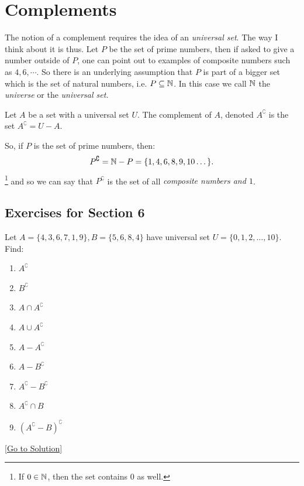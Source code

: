 \section{Complements}
The notion of a complement requires the idea of an \emph{universal set}. The way I think about it is thus. Let $P$ be the set of prime numbers, then if asked to give a number outside of $P$, one can point out to examples of composite numbers such as $4,6, \cdots$. So there is an underlying assumption that $P$ is part of a bigger set which is the set of natural numbers, i.e. $P\subseteq\mathbb{N}$. In this case we call $\mathbb{N}$ the \emph{universe} or the \emph{universal set.}
\begin{defn}
    Let $A$ be a set with a universal set $U$. The complement of $A$, denoted $A^{\complement}$ is the set $A^{\complement}=U-A$.
\end{defn}

So, if $P$ is the set of prime numbers, then: 
$$
P^{\complement}=\mathbb{N}-P=\{ 1,4,6,8,9,10\dots \}.
$$\footnote{If $0\in\mathbb{N}$, then the set contains $0$ as well.}
and so we can say that $P^{\complement}$ is the set of all \emph{composite numbers and $1$}. 

\subsection{Exercises for Section 6}
\begin{exercise}\label{ex:6.1}
    Let $A=\{ 4,3,6,7,1,9 \}, B=\{ 5,6,8,4 \}$ have universal set $U=\{ 0,1,2,\dots,10 \}$. Find: 
    \begin{enumerate}
        \item $A^{\complement}$
        \item $B^{\complement}$
        \item $A\cap A^{\complement}$
        \item $A\cup A^{\complement}$
        \item $A-A^{\complement}$
        \item $A-B^{\complement}$
        \item $A^{\complement}-B^{\complement}$
        \item $A^{\complement}\cap B$
        \item $(A^{\complement}-B)^{\complement}$
    \end{enumerate}
\end{exercise}\hyperref[sol:6.1]{[Go to Solution]}

